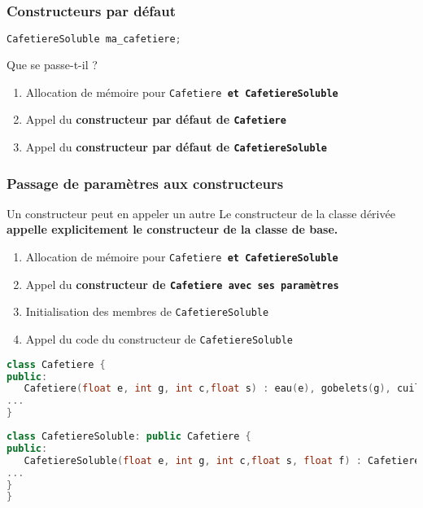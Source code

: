 \documentclass{beamer}
\begin{document}
\begin{frame}[fragile=singleslide,shrink=20]
\frametitle {Constructeurs par défaut}

\begin{lstlisting}[language=c++]
CafetiereSoluble ma_cafetiere;
\end{lstlisting}

\begin{block}{Que se passe-t-il ?}
\begin{enumerate}
\item Allocation de mémoire pour \tt{Cafetiere} \bf{et} \tt{CafetiereSoluble}
\item Appel du \bf{constructeur par défaut} de \tt{Cafetiere}
\item Appel du \bf{constructeur par défaut} de \tt{CafetiereSoluble}
\end{enumerate}
\end{block}
\end{frame}

\begin{frame}[fragile=singleslide,shrink=20]
\frametitle {Passage de paramètres aux constructeurs}

\begin{block}{Un constructeur peut en appeler un autre}
Le constructeur de la classe dérivée \bf{appelle explicitement} le constructeur de la classe de base.

\begin{enumerate}
\item Allocation de mémoire pour \tt{Cafetiere} \bf{et} \tt{CafetiereSoluble}
\item Appel du \bf{constructeur} de \tt{Cafetiere} \bf{avec ses paramètres}
\item Initialisation des membres de \tt{CafetiereSoluble}
\item Appel du code du constructeur de \tt{CafetiereSoluble}
\end{enumerate}
\end{block}

\begin{lstlisting}[language=c++]
class Cafetiere {
public:
   Cafetiere(float e, int g, int c,float s) : eau(e), gobelets(g), cuillers(c), sucre(s) {};
...
}
\end{lstlisting}

\begin{lstlisting}[language=c++]
class CafetiereSoluble: public Cafetiere {
public:
   CafetiereSoluble(float e, int g, int c,float s, float f) : Cafetiere(e,g,c,s), cafe(f) {};
...
}
}
\end{lstlisting}
\end{frame}
\end{document}
